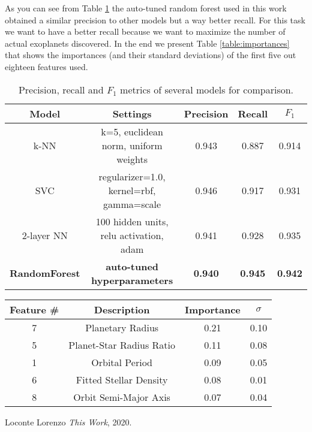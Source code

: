 \documentclass[11pt, a4paper]{article}
\begin{document}
\begin{multicols}{2}
  As you can see from Table \ref{table:benchmark} the auto-tuned random forest used in this work obtained a similar precision to other models but a way better recall. For this task we want to have a better recall because we want to maximize the number of actual exoplanets discovered.
  In the end we present Table \ref{table:importances} that shows the importances (and their standard deviations) of the first five out eighteen features used.
\end{multicols}

  \begin{table}
    \centering
    \begin{tabular}{|c c c c c|}
      \hline
      Model & Settings & Precision & Recall & $F_{1}$  \\
      \hline\hline
      k-NN & k=5, euclidean norm, uniform weights & 0.943 & 0.887 & 0.914 \\
      \hline
      SVC & regularizer=1.0, kernel=rbf, gamma=scale & 0.946 & 0.917 & 0.931 \\
      \hline
      2-layer NN & 100 hidden units, relu activation, adam & 0.941 & 0.928 & 0.935 \\
      \hline
      \textbf{RandomForest} & \textbf{auto-tuned hyperparameters} & \textbf{0.940} & \textbf{0.945} & \textbf{0.942} \\
      \hline
    \end{tabular}
    \caption{Precision, recall and $F_{1}$ metrics of several models for comparison.}
    \label{table:benchmark}
  \end{table}

  \begin{table}
    \centering
    \begin{tabular}{|c c c c|}
    \hline
    Feature \# & Description & Importance & $\sigma$ \\
    \hline\hline
    7 & Planetary Radius & 0.21 & 0.10 \\
    5 & Planet-Star Radius Ratio & 0.11 & 0.08 \\
    1 & Orbital Period & 0.09 & 0.05 \\
    6 & Fitted Stellar Density & 0.08 & 0.01 \\
    8 & Orbit Semi-Major Axis & 0.07 & 0.04 \\
    \hline
    \end{tabular}
  \end{table}

\newpage
\begin{thebibliography}{9}
    Loconte Lorenzo
    \textit{This Work}, 2020.
\end{thebibliography}
\end{document}
